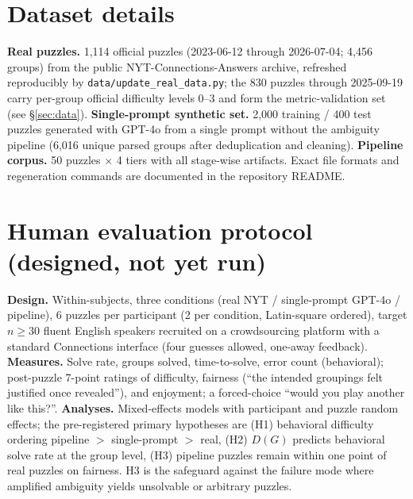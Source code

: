 \documentclass[11pt]{article}
\begin{document}
\section{Dataset details}
\label{app:data}

\textbf{Real puzzles.} 1,114 official puzzles (2023-06-12 through 2026-07-04; 4,456 groups) from the public NYT-Connections-Answers archive, refreshed reproducibly by \texttt{data/update\_real\_data.py}; the 830 puzzles through 2025-09-19 carry per-group official difficulty levels 0--3 and form the metric-validation set (see \S\ref{sec:data}). \textbf{Single-prompt synthetic set.} 2,000 training / 400 test puzzles generated with GPT-4o from a single prompt without the ambiguity pipeline (6,016 unique parsed groups after deduplication and cleaning). \textbf{Pipeline corpus.} 50 puzzles $\times$ 4 tiers with all stage-wise artifacts. Exact file formats and regeneration commands are documented in the repository README.

\section{Human evaluation protocol (designed, not yet run)}
\label{app:human}

\textbf{Design.} Within-subjects, three conditions (real NYT / single-prompt GPT-4o / pipeline), 6 puzzles per participant (2 per condition, Latin-square ordered), target $n \geq 30$ fluent English speakers recruited on a crowdsourcing platform with a standard Connections interface (four guesses allowed, one-away feedback). \textbf{Measures.} Solve rate, groups solved, time-to-solve, error count (behavioral); post-puzzle 7-point ratings of difficulty, fairness (``the intended groupings felt justified once revealed''), and enjoyment; a forced-choice ``would you play another like this?''. \textbf{Analyses.} Mixed-effects models with participant and puzzle random effects; the pre-registered primary hypotheses are (H1) behavioral difficulty ordering pipeline $>$ single-prompt $>$ real, (H2) $D(G)$ predicts behavioral solve rate at the group level, (H3) pipeline puzzles remain within one point of real puzzles on fairness. H3 is the safeguard against the failure mode where amplified ambiguity yields unsolvable or arbitrary puzzles.
\end{document}
